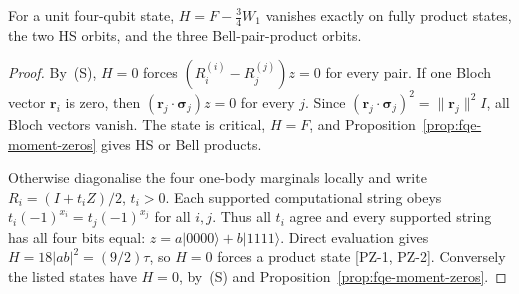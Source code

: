 \begin{lemma}
\label{lem:fqe-polarization-remainder-zeros}
For a unit four-qubit state, $H=F-\frac34W_1$ vanishes exactly on
fully product states, the two HS orbits, and the three Bell-pair-product
orbits.
\end{lemma}
\begin{proof}
By~(S), $H=0$ forces $(R_i^{(i)}-R_j^{(j)})z=0$ for every pair.
If one Bloch vector $\mathbf r_i$ is zero, then
$(\mathbf r_j\cdot\boldsymbol\sigma_j)z=0$ for every $j$.
Since $(\mathbf r_j\cdot\boldsymbol\sigma_j)^2=\|\mathbf r_j\|^2I$,
all Bloch vectors vanish. The state is critical, $H=F$, and
Proposition~\ref{prop:fqe-moment-zeros} gives HS or Bell products.

Otherwise diagonalise the four one-body marginals locally and write
$R_i=(I+t_iZ)/2$, $t_i>0$. Each supported computational string obeys
$t_i(-1)^{x_i}=t_j(-1)^{x_j}$ for all $i,j$.
Thus all $t_i$ agree and every supported string has all four bits equal:
$z=a|0000\rangle+b|1111\rangle$. Direct evaluation gives
$H=18|ab|^2=(9/2)\tau$, so $H=0$ forces a product state [PZ-1, PZ-2].
Conversely the listed states have $H=0$, by~(S) and
Proposition~\ref{prop:fqe-moment-zeros}.
\end{proof}

